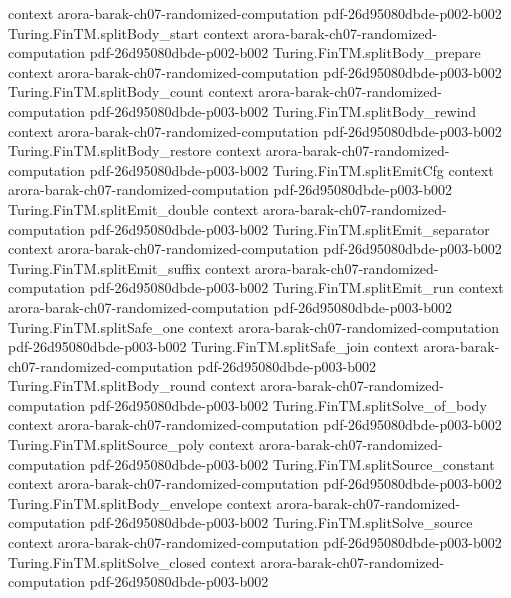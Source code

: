 \begin{theorem}
  {context}
  {arora-barak-ch07-randomized-computation}
  {pdf-26d95080dbde-p002-b002}
\proofstep
  {Turing.FinTM.splitBody_start}
  {context}
  {arora-barak-ch07-randomized-computation}
  {pdf-26d95080dbde-p002-b002}
\proofstep
  {Turing.FinTM.splitBody_prepare}
  {context}
  {arora-barak-ch07-randomized-computation}
  {pdf-26d95080dbde-p003-b002}
\proofstep
  {Turing.FinTM.splitBody_count}
  {context}
  {arora-barak-ch07-randomized-computation}
  {pdf-26d95080dbde-p003-b002}
\proofstep
  {Turing.FinTM.splitBody_rewind}
  {context}
  {arora-barak-ch07-randomized-computation}
  {pdf-26d95080dbde-p003-b002}
\proofstep
  {Turing.FinTM.splitBody_restore}
  {context}
  {arora-barak-ch07-randomized-computation}
  {pdf-26d95080dbde-p003-b002}
\proofstep
  {Turing.FinTM.splitEmitCfg}
  {context}
  {arora-barak-ch07-randomized-computation}
  {pdf-26d95080dbde-p003-b002}
\proofstep
  {Turing.FinTM.splitEmit_double}
  {context}
  {arora-barak-ch07-randomized-computation}
  {pdf-26d95080dbde-p003-b002}
\proofstep
  {Turing.FinTM.splitEmit_separator}
  {context}
  {arora-barak-ch07-randomized-computation}
  {pdf-26d95080dbde-p003-b002}
\proofstep
  {Turing.FinTM.splitEmit_suffix}
  {context}
  {arora-barak-ch07-randomized-computation}
  {pdf-26d95080dbde-p003-b002}
\proofstep
  {Turing.FinTM.splitEmit_run}
  {context}
  {arora-barak-ch07-randomized-computation}
  {pdf-26d95080dbde-p003-b002}
\proofstep
  {Turing.FinTM.splitSafe_one}
  {context}
  {arora-barak-ch07-randomized-computation}
  {pdf-26d95080dbde-p003-b002}
\proofstep
  {Turing.FinTM.splitSafe_join}
  {context}
  {arora-barak-ch07-randomized-computation}
  {pdf-26d95080dbde-p003-b002}
\proofstep
  {Turing.FinTM.splitBody_round}
  {context}
  {arora-barak-ch07-randomized-computation}
  {pdf-26d95080dbde-p003-b002}
\proofstep
  {Turing.FinTM.splitSolve_of_body}
  {context}
  {arora-barak-ch07-randomized-computation}
  {pdf-26d95080dbde-p003-b002}
\proofstep
  {Turing.FinTM.splitSource_poly}
  {context}
  {arora-barak-ch07-randomized-computation}
  {pdf-26d95080dbde-p003-b002}
\proofstep
  {Turing.FinTM.splitSource_constant}
  {context}
  {arora-barak-ch07-randomized-computation}
  {pdf-26d95080dbde-p003-b002}
\proofstep
  {Turing.FinTM.splitBody_envelope}
  {context}
  {arora-barak-ch07-randomized-computation}
  {pdf-26d95080dbde-p003-b002}
\proofstep
  {Turing.FinTM.splitSolve_source}
  {context}
  {arora-barak-ch07-randomized-computation}
  {pdf-26d95080dbde-p003-b002}
\proofstep
  {Turing.FinTM.splitSolve_closed}
  {context}
  {arora-barak-ch07-randomized-computation}
  {pdf-26d95080dbde-p003-b002}
\proofstep

\end{theorem}

